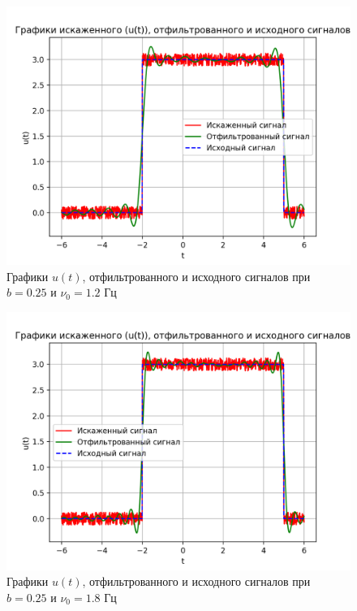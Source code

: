 \begin{figure}[ht!]
    \centering
    \includegraphics[scale=0.85]{media/1 task/high_freq/Cleaned_0,25_-1,1981981981981982.png}
    \caption{Графики  $u(t)$, отфильтрованного и исходного сигналов при $b=0.25$ и $\nu_0=1.2$ Гц}
    \label{fig:cleaned_025_12}
\end{figure}

\clearpage

\begin{figure}[ht!]
    \centering
    \includegraphics[scale=0.85]{media/1 task/high_freq/Cleaned_0,25_-1,7987987987987988.png}
    \caption{Графики  $u(t)$, отфильтрованного и исходного сигналов при $b=0.25$ и $\nu_0=1.8$ Гц} 
    \label{fig:cleaned_025_18}
\end{figure}

